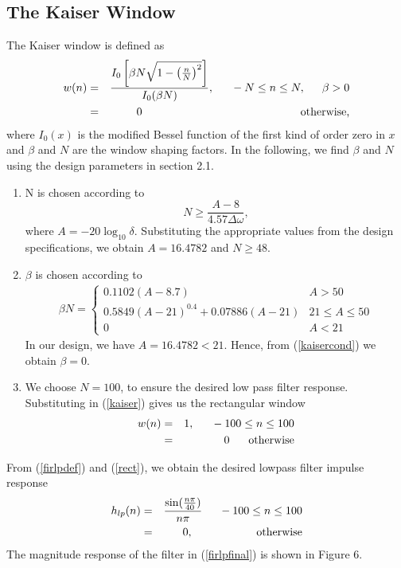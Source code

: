 \documentclass{article}
\begin{document}
\subsection{The Kaiser Window}
The Kaiser window is defined as
\begin{eqnarray}
\label{kaiser}
w(n) &=& \frac{I_0\left[ \beta N \sqrt{1 - \left(\frac{n}{N}\right)^2} \right]}{I_0(\beta N)},
\indent -N \leq n \leq N, \indent \beta > 0 \nonumber \\
&=& 0 \hspace{5cm} \mbox{otherwise,}
\end{eqnarray}
where $I_0(x)$ is the modified Bessel function of the first kind of order zero in $x$ and $\beta$
and $N$ are the window shaping factors.  In the following,
we find $\beta$ and $N$ using the design parameters in section 2.1.

\begin{enumerate}
\item  N is chosen according to
\begin{equation}
N \geq \frac{A-8}{4.57\Delta \omega},
\end{equation}
where $A = -20\log_{10}\delta$.  Substituting the appropriate values from the design specifications, we obtain
$A = 16.4782$ and $N \geq 48$.

\item  $\beta$ is chosen according to
\begin{eqnarray}
\label{kaisercond}
\beta N = \left\{ \begin{array}{ll} 0.1102(A-8.7) & A > 50 \\
0.5849(A-21)^{0.4}+ 0.07886(A-21) & 21 \leq A \leq 50 \\
0 & A < 21\end{array} \right.
\end{eqnarray}
In our design, we have $A = 16.4782 < 21$.  Hence, from (\ref{kaisercond}) we obtain $\beta = 0$.  

\item We choose $N = 100$, to ensure the desired low pass filter response.  Substituting in (\ref{kaiser})
gives us the rectangular window
\begin{eqnarray}
\label{rect}
w(n) &=& 1, \indent -100 \leq n \leq 100 \nonumber \\
&=& 0 \hspace{6mm} \mbox{otherwise}
\end{eqnarray}
\end{enumerate}

From (\ref{firlpdef}) and (\ref{rect}), we obtain the desired lowpass filter impulse response
\begin{eqnarray}
\label{firlpfinal}
h_{lp}(n) &=& \frac{\sin(\frac{n\pi}{40})}{n\pi} \indent -100 \leq n \leq 100 \nonumber \\
&=& 0, \hspace{2cm} \mbox{otherwise}
\end{eqnarray}
The magnitude  response of the filter in (\ref{firlpfinal}) is shown in Figure 6.
\end{document}
